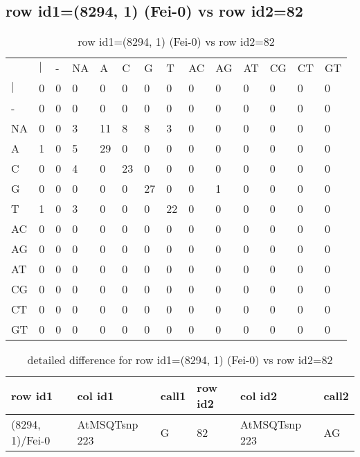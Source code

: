 \subsection{row id1=(8294, 1) (Fei-0) vs row id2=82}
\begin{center}
\begin{longtable}{|l|l|l|l|l|l|l|l|l|l|l|l|l|l|}
\caption{row id1=(8294, 1) (Fei-0) vs row id2=82} \label{table_dm272}\\
\hline
\\
\hline
&$|$&-&NA&A&C&G&T&AC&AG&AT&CG&CT&GT\\
$|$&0&0&0&0&0&0&0&0&0&0&0&0&0\\
-&0&0&0&0&0&0&0&0&0&0&0&0&0\\
NA&0&0&3&11&8&8&3&0&0&0&0&0&0\\
A&1&0&5&29&0&0&0&0&0&0&0&0&0\\
C&0&0&4&0&23&0&0&0&0&0&0&0&0\\
G&0&0&0&0&0&27&0&0&1&0&0&0&0\\
T&1&0&3&0&0&0&22&0&0&0&0&0&0\\
AC&0&0&0&0&0&0&0&0&0&0&0&0&0\\
AG&0&0&0&0&0&0&0&0&0&0&0&0&0\\
AT&0&0&0&0&0&0&0&0&0&0&0&0&0\\
CG&0&0&0&0&0&0&0&0&0&0&0&0&0\\
CT&0&0&0&0&0&0&0&0&0&0&0&0&0\\
GT&0&0&0&0&0&0&0&0&0&0&0&0&0\\
\hline
\end{longtable}
\end{center}

\begin{center}
\begin{longtable}{|l|l|l|l|l|l|}
\caption{detailed difference for row id1=(8294, 1) (Fei-0) vs row id2=82} \label{table_dm273}\\
\hline
row id1&col id1&call1&row id2&col id2&call2\\
\hline
(8294, 1)/Fei-0&AtMSQTsnp 223&G&82&AtMSQTsnp 223&AG\\
\hline
\end{longtable}
\end{center}


